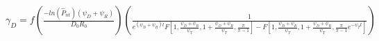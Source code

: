 \documentclass[10pt]{article}
\begin{document}
$\gamma_D = f\left(\frac{-ln(\hat{P}_{nt})({\psi_D}+{\psi_R})}{{D_0}{R_0}}\right) \left(\frac{1}{e^{({\psi_D}+{\psi_R})t}F[1, \frac{{\psi_D}+{\psi_R}}{{\psi_T}}, 1+\frac{{\psi_D}+{\psi_R}}{{\psi_T}}, \frac{{\pi}}{{\pi}-1}]-F[1, \frac{{\psi_D}+{\psi_R}}{{\psi_T}}, 1+\frac{{\psi_D}+{\psi_R}}{{\psi_T}},\frac{{\pi}}{{\pi}-1}e^{-\psi_Tt}]}\right)
$
\end{document}
